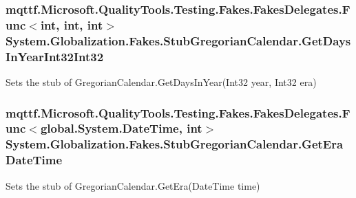 \hypertarget{class_system_1_1_globalization_1_1_fakes_1_1_stub_gregorian_calendar_abaa8ddd3de98eb1b7d3e8502b096a0bd}{
\subsubsection[{Get\-Days\-In\-Year\-Int32\-Int32}]{\setlength{\rightskip}{0pt plus 5cm}mqttf.\-Microsoft.\-Quality\-Tools.\-Testing.\-Fakes.\-Fakes\-Delegates.\-Func$<$int, int, int$>$ System.\-Globalization.\-Fakes.\-Stub\-Gregorian\-Calendar.\-Get\-Days\-In\-Year\-Int32\-Int32}}\label{class_system_1_1_globalization_1_1_fakes_1_1_stub_gregorian_calendar_abaa8ddd3de98eb1b7d3e8502b096a0bd}


Sets the stub of Gregorian\-Calendar.\-Get\-Days\-In\-Year(\-Int32 year, Int32 era)

\hypertarget{class_system_1_1_globalization_1_1_fakes_1_1_stub_gregorian_calendar_ad07b83c04efceeccbf23c67fd3a1bd08}{
\subsubsection[{Get\-Era\-Date\-Time}]{\setlength{\rightskip}{0pt plus 5cm}mqttf.\-Microsoft.\-Quality\-Tools.\-Testing.\-Fakes.\-Fakes\-Delegates.\-Func$<$global.\-System.\-Date\-Time, int$>$ System.\-Globalization.\-Fakes.\-Stub\-Gregorian\-Calendar.\-Get\-Era\-Date\-Time}}\label{class_system_1_1_globalization_1_1_fakes_1_1_stub_gregorian_calendar_ad07b83c04efceeccbf23c67fd3a1bd08}


Sets the stub of Gregorian\-Calendar.\-Get\-Era(\-Date\-Time time)

